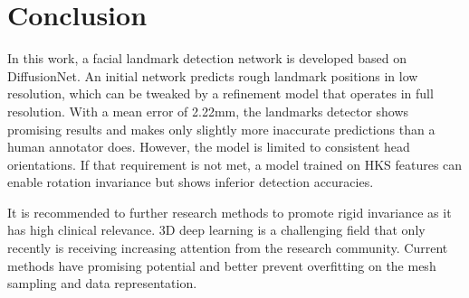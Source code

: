 \documentclass[class=article, crop=false]{standalone}
\begin{document}
\section{Conclusion}
\label{sec:conclusion}


In this work, a facial landmark detection network is developed based on DiffusionNet. An initial network predicts rough landmark positions in low resolution, which can be tweaked by a refinement model that operates in full resolution. With a mean error of 2.22mm, the landmarks detector shows promising results and makes only slightly more inaccurate predictions than a human annotator does. However, the model is limited to consistent head orientations. If that requirement is not met, a model trained on HKS features can enable rotation invariance but shows inferior detection accuracies.


It is recommended to further research methods to promote rigid invariance as it has high clinical relevance. 3D deep learning is a challenging field that only recently is receiving increasing attention from the research community. Current methods have promising potential and better prevent overfitting on the mesh sampling and data representation.

\end{document}
